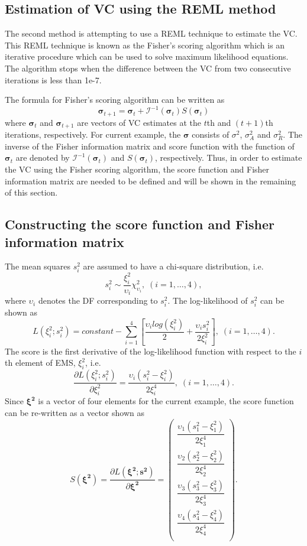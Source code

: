 \documentclass[12pt,a4paper]{article}
\begin{document}
\subsection{Estimation of VC using the REML method}  
The second method is attempting to use a REML technique to estimate the VC. This REML technique is known as the Fisher's scoring algorithm which is an iterative procedure which can be used to solve maximum likelihood equations. The algorithm stops when the difference between the VC from two consecutive iterations is less than 1e-7. 

The formula for Fisher's scoring algorithm can be written as 
\begin{equation}\label{eq:fisherScore}
\bm{\sigma}_{t+1}= \bm{\sigma}_t+\mathcal{I}^{-1}(\bm{\sigma}_t )S(\bm{\sigma}_t )
\end{equation}
where $\bm{\sigma}_{t}$ and $\bm{\sigma}_{t+1}$ are vectors of VC estimates at the $t$th and $(t+1)$th iterations, respectively. For current example, the $\bm{\sigma}$ consists of $\sigma^2$, $\sigma_A^2$ and $\sigma_R^2$. The inverse of the Fisher information matrix and score function with the function of $\bm{\sigma}_t$ are denoted by $\mathcal{I}^{-1}(\bm{\sigma}_t )$ and $S(\bm{\sigma}_t )$, respectively. Thus, in order to estimate the VC using the Fisher scoring algorithm, the score function and Fisher information matrix are needed to be defined and will be shown in the remaining of this section. 

\subsection{Constructing the score function and Fisher information matrix} 
The mean squares $s_i^2$ are assumed to have a chi-square distribution, i.e.\
\begin{equation}
s_i^2 \sim \dfrac{\xi_i^2}{\upsilon_i} \chi_{\upsilon_i}^2, \;  (i = 1,\dots,4), 
\end{equation}
where $\upsilon_i$ denotes the DF corresponding to $s_i^2$. The log-likelihood of $s_i^2$ can be shown as 
\[L(\xi_i^2;s_i^2) = constant - \sum_{i = 1}^{4}\left[ \dfrac{\upsilon_i log(\xi_i^2)}{2} + \dfrac{\upsilon_i s_i^2}{2\xi_i^2}\right], \;  (i = 1,\dots,4). \]   
The score is the first derivative of the log-likelihood function with respect to the $i$th element of EMS, $\xi_i^2$, i.e.\
\[\dfrac{\partial L(\xi_i^2;s_i^2)}{\partial \xi_i^2} = \dfrac{\upsilon_i (s_i^2 - \xi_i^2)}{2\xi_i^4}, \;  (i = 1,\dots,4).\]
Since $\bm{\xi^2}$ is a vector of four elements for the current example, the score function can be re-written as a vector shown as 
\[S(\bm{\xi^2}) = \dfrac{\partial L(\bm{\xi^2};\bm{s^2})}{\partial \bm{\xi^2}} = 
\begin{pmatrix}               
\dfrac{\upsilon_1 (s_1^2 - \xi_1^2)}{2\xi_1^4} \\
 \dfrac{\upsilon_2 (s_2^2 - \xi_2^2)}{2\xi_2^4} \\
 \dfrac{\upsilon_3 (s_3^2 - \xi_3^2)}{2\xi_3^4}  \\
\dfrac{\upsilon_4 (s_4^2 - \xi_4^2)}{2\xi_4^4}  \\
\end{pmatrix}. \]
\end{document}
